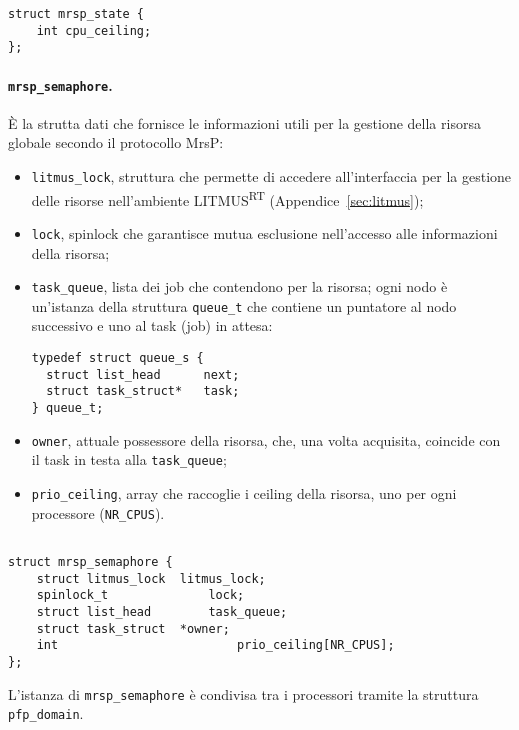 \begin{lstlisting}
struct mrsp_state {
	int cpu_ceiling;
};
\end{lstlisting}

\paragraph{\texttt{mrsp\_semaphore}.} \`E la strutta dati che fornisce le informazioni utili per la gestione della risorsa globale secondo il protocollo MrsP:

\begin{itemize}
\item \texttt{litmus\_lock}, struttura che permette di accedere all'interfaccia per la gestione delle risorse nell'ambiente LITMUS\textsuperscript{RT} (Appendice~\ref{sec:litmus});
\item \texttt{lock}, spinlock che garantisce mutua esclusione nell'accesso alle informazioni della risorsa;
\item \texttt{task\_queue}, lista dei job che contendono per la risorsa; ogni nodo è un'istanza della struttura \texttt{queue\_t} che contiene un puntatore al nodo successivo e uno al task (job) in attesa:

\begin{lstlisting}
typedef struct queue_s {
  struct list_head 		next;
  struct task_struct* 	task;
} queue_t;
\end{lstlisting}

\item \texttt{owner}, attuale possessore della risorsa, che, una volta acquisita, coincide con il task in testa alla \texttt{task\_queue};
\item \texttt{prio\_ceiling}, array che raccoglie i ceiling della risorsa, uno per ogni processore (\texttt{NR\_CPUS}).
\end{itemize}

\begin{lstlisting}[label={lst:mrsp_semaphore}] %@\label{lst:domain.spinlock}@

struct mrsp_semaphore {
	struct litmus_lock 	litmus_lock;
	spinlock_t 				lock;
	struct list_head 		task_queue;
	struct task_struct 	*owner;
	int 						prio_ceiling[NR_CPUS];
};
\end{lstlisting}

L'istanza di \texttt{mrsp\_semaphore} è condivisa tra i processori tramite la struttura \texttt{pfp\_domain}.

